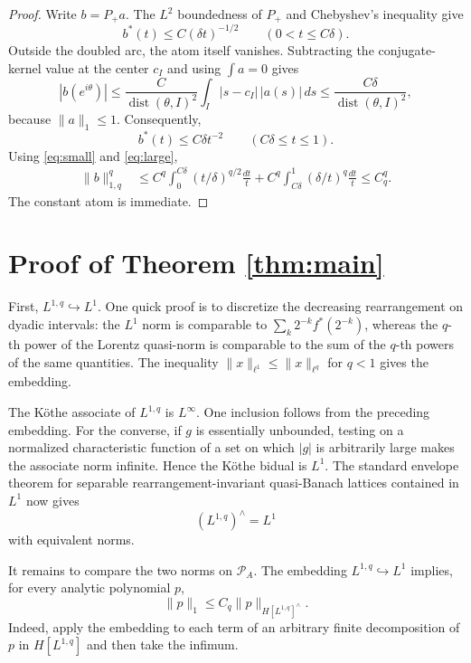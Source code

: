 \documentclass[11pt]{article}
\newcommand{\PA}{\mathcal P_A}
\begin{document}
\begin{proof}
Write $b=P_+a$.  The $L^2$ boundedness of $P_+$ and Chebyshev's inequality
give
\begin{equation}\label{eq:small}
 b^*(t)\le C(\delta t)^{-1/2}\qquad(0<t\le C\delta).
\end{equation}
Outside the doubled arc, the atom itself vanishes.  Subtracting the
conjugate-kernel value at the center $c_I$ and using $\int a=0$ gives
\[
 |b(e^{i\theta})|
 \le \frac{C}{\operatorname{dist}(\theta,I)^2}
       \int_I|s-c_I|\,|a(s)|\,ds
 \le \frac{C\delta}{\operatorname{dist}(\theta,I)^2},
\]
because $\|a\|_1\le1$.  Consequently,
\begin{equation}\label{eq:large}
 b^*(t)\le C\delta t^{-2}\qquad(C\delta\le t\le1).
\end{equation}
Using \eqref{eq:small} and \eqref{eq:large},
\begin{align*}
 \|b\|_{1,q}^q
 &\le C^q\int_0^{C\delta}(t/\delta)^{q/2}\frac{dt}{t}
 +C^q\int_{C\delta}^1(\delta/t)^q\frac{dt}{t}
 \le C_q^q.
\end{align*}
The constant atom is immediate.
\end{proof}

\section*{Proof of Theorem \ref{thm:main}}

First, $L^{1,q}\hookrightarrow L^1$.  One quick proof is to discretize the
decreasing rearrangement on dyadic intervals: the $L^1$ norm is comparable
to $\sum_k2^{-k}f^*(2^{-k})$, whereas the $q$-th power of the Lorentz
quasi-norm is comparable to the sum of the $q$-th powers of the same
quantities.  The inequality $\|x\|_{\ell^1}\le\|x\|_{\ell^q}$ for
$q<1$ gives the embedding.

The K\"othe associate of $L^{1,q}$ is $L^\infty$.  One inclusion follows
from the preceding embedding.  For the converse, if $g$ is essentially
unbounded, testing on a normalized characteristic function of a set on
which $|g|$ is arbitrarily large makes the associate norm infinite.  Hence
the K\"othe bidual is $L^1$.  The standard envelope theorem for separable
rearrangement-invariant quasi-Banach lattices contained in $L^1$ now gives
\begin{equation}\label{eq:latticeenv}
 (L^{1,q})^{\wedge}=L^1
\end{equation}
with equivalent norms.

It remains to compare the two norms on $\PA$.  The embedding
$L^{1,q}\hookrightarrow L^1$ implies, for every analytic polynomial $p$,
\begin{equation}\label{eq:lower}
 \|p\|_1\le C_q\|p\|_{H[L^{1,q}]^{\wedge}}.
\end{equation}
Indeed, apply the embedding to each term of an arbitrary finite
decomposition of $p$ in $H[L^{1,q}]$ and then take the infimum.
\end{document}
